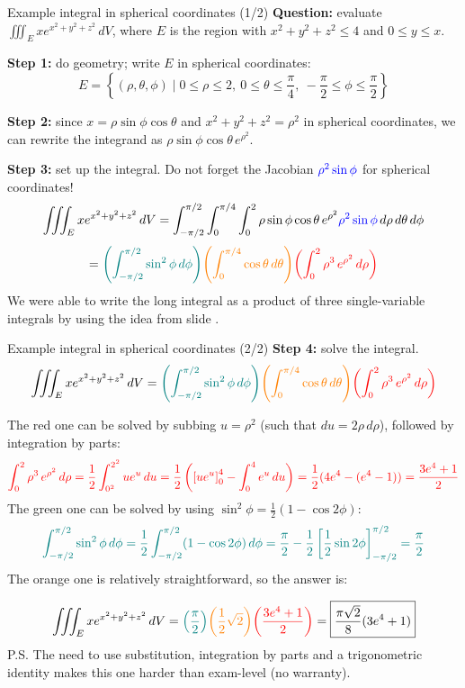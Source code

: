 \begin{frame}{Example integral in spherical coordinates (1/2)}
    \footnotesize
    \textbf{Question:} evaluate $\iiint_E xe^{x^2+y^2+z^2}\,dV$, where $E$ is the region with $x^2+y^2+z^2\leq4$ and $0\leq y\leq x$.

    \textbf{Step 1:} do geometry; write $E$ in spherical coordinates:
    \[E=\left\{(\rho,\theta,\phi) \mid 0\leq\rho\leq2,~0\leq\theta\leq\frac{\pi}{4},~-\frac{\pi}{2}\leq\phi\leq\frac{\pi}{2}\right\}\]

    \textbf{Step 2:} since $x=\rho\sin\phi\cos\theta$ and $x^2+y^2+z^2=\rho^2$ in spherical coordinates, we can rewrite the integrand as $\rho\sin\phi\cos\theta \,e^{\rho^2}$.

    \textbf{Step 3:} set up the integral. Do not forget the Jacobian $\textcolor{blue}{\rho^2\sin\phi}$ for spherical coordinates!
    \[\iiint_E xe^{x^2+y^2+z^2}\,dV = \int_{-\pi/2}^{\pi/2}\int_0^{\pi/4}\int_0^2 \rho\sin\phi\cos\theta\,e^{\rho^2}\textcolor{blue}{\rho^2\sin\phi}\,d\rho\,d\theta\,d\phi\]
    \[=\textcolor{teal}{\left(\int_{-\pi/2}^{\pi/2}\sin^2\phi\,d\phi\right)}\textcolor{orange}{\left(\int_0^{\pi/4}\cos\theta\,d\theta\right)}\textcolor{red}{\left(\int_0^2\rho^3\,e^{\rho^2}\,d\rho\right)}
 \]
    We were able to write the long integral as a product of three single-variable integrals by using the idea from slide \blue{\ref{integraltrick}}.
\end{frame}

\begin{frame}{Example integral in spherical coordinates (2/2)}
    \footnotesize
    \textbf{Step 4:} solve the integral.
    \[
        \iiint_E xe^{x^2+y^2+z^2}\,dV =\textcolor{teal}{\left(\int_{-\pi/2}^{\pi/2}\sin^2\phi\,d\phi\right)}\textcolor{orange}{\left(\int_0^{\pi/4}\cos\theta\,d\theta\right)}\textcolor{red}{\left(\int_0^2\rho^3\,e^{\rho^2}\,d\rho\right)}
    \]

    The red one can be solved by subbing $u=\rho^2$ (such that $du=2\rho \,d\rho$), followed by integration by parts:
    \[\textcolor{red}{\int_0^2\rho^3\,e^{\rho^2}\,d\rho=\frac{1}{2}\int_{0^2}^{2^2}ue^u\,du=\frac{1}{2}\left(\left[ue^u\right]_0^4-\int_0^4e^u\,du\right)=\frac{1}{2}(4e^4-(e^4-1))=\frac{3e^4+1}{2}}\]
    The green one can be solved by using $\sin^2\phi=\frac{1}{2}\left(1-\cos2\phi\right)$:
    \[\textcolor{teal}{\int_{-\pi/2}^{\pi/2}\sin^2\phi\,d\phi=\frac{1}{2}\int_{-\pi/2}^{\pi/2}(1-\cos2\phi)\,d\phi=\frac{\pi}{2}-\frac{1}{2}\left[\frac{1}{2}\sin2\phi\right]_{-\pi/2}^{\pi/2}=\frac{\pi}{2}}\]
    The orange one is relatively straightforward, so the answer is:

    \[
        \iiint_E xe^{x^2+y^2+z^2}\,dV =\textcolor{teal}{\left(\frac{\pi}{2}\right)}\textcolor{orange}{\left(\frac{1}{2}\sqrt{2}\right)}\textcolor{red}{\left(\frac{3e^4+1}{2}\right)}=\boxed{\frac{\pi\sqrt2}{8}(3e^4+1)}
    \]
    P.S. The need to use substitution, integration by parts and a trigonometric identity makes this one harder than exam-level (no warranty). 
\end{frame}
